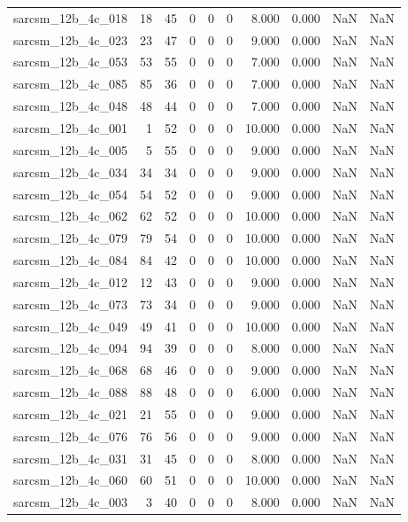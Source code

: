 \documentclass{article}
\begin{document}
\begin{longtable}{lrrrrrrrrr}
sarcsm\_12b\_4c\_018 & 18 & 45 & 0 & 0 & 0 & 8.000 & 0.000 & NaN & NaN \\
sarcsm\_12b\_4c\_023 & 23 & 47 & 0 & 0 & 0 & 9.000 & 0.000 & NaN & NaN \\
sarcsm\_12b\_4c\_053 & 53 & 55 & 0 & 0 & 0 & 7.000 & 0.000 & NaN & NaN \\
sarcsm\_12b\_4c\_085 & 85 & 36 & 0 & 0 & 0 & 7.000 & 0.000 & NaN & NaN \\
sarcsm\_12b\_4c\_048 & 48 & 44 & 0 & 0 & 0 & 7.000 & 0.000 & NaN & NaN \\
sarcsm\_12b\_4c\_001 & 1 & 52 & 0 & 0 & 0 & 10.000 & 0.000 & NaN & NaN \\
sarcsm\_12b\_4c\_005 & 5 & 55 & 0 & 0 & 0 & 9.000 & 0.000 & NaN & NaN \\
sarcsm\_12b\_4c\_034 & 34 & 34 & 0 & 0 & 0 & 9.000 & 0.000 & NaN & NaN \\
sarcsm\_12b\_4c\_054 & 54 & 52 & 0 & 0 & 0 & 9.000 & 0.000 & NaN & NaN \\
sarcsm\_12b\_4c\_062 & 62 & 52 & 0 & 0 & 0 & 10.000 & 0.000 & NaN & NaN \\
sarcsm\_12b\_4c\_079 & 79 & 54 & 0 & 0 & 0 & 10.000 & 0.000 & NaN & NaN \\
sarcsm\_12b\_4c\_084 & 84 & 42 & 0 & 0 & 0 & 10.000 & 0.000 & NaN & NaN \\
sarcsm\_12b\_4c\_012 & 12 & 43 & 0 & 0 & 0 & 9.000 & 0.000 & NaN & NaN \\
sarcsm\_12b\_4c\_073 & 73 & 34 & 0 & 0 & 0 & 9.000 & 0.000 & NaN & NaN \\
sarcsm\_12b\_4c\_049 & 49 & 41 & 0 & 0 & 0 & 10.000 & 0.000 & NaN & NaN \\
sarcsm\_12b\_4c\_094 & 94 & 39 & 0 & 0 & 0 & 8.000 & 0.000 & NaN & NaN \\
sarcsm\_12b\_4c\_068 & 68 & 46 & 0 & 0 & 0 & 9.000 & 0.000 & NaN & NaN \\
sarcsm\_12b\_4c\_088 & 88 & 48 & 0 & 0 & 0 & 6.000 & 0.000 & NaN & NaN \\
sarcsm\_12b\_4c\_021 & 21 & 55 & 0 & 0 & 0 & 9.000 & 0.000 & NaN & NaN \\
sarcsm\_12b\_4c\_076 & 76 & 56 & 0 & 0 & 0 & 9.000 & 0.000 & NaN & NaN \\
sarcsm\_12b\_4c\_031 & 31 & 45 & 0 & 0 & 0 & 8.000 & 0.000 & NaN & NaN \\
sarcsm\_12b\_4c\_060 & 60 & 51 & 0 & 0 & 0 & 10.000 & 0.000 & NaN & NaN \\
sarcsm\_12b\_4c\_003 & 3 & 40 & 0 & 0 & 0 & 8.000 & 0.000 & NaN & NaN \\

\end{longtable}
\end{document}
